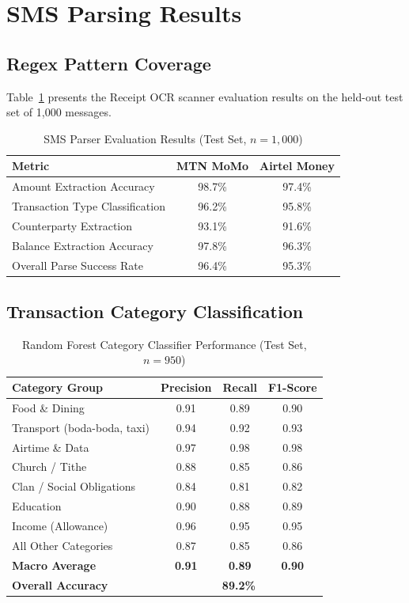 \documentclass[12pt]{report}
\begin{document}
\section{SMS Parsing Results}

\subsection{Regex Pattern Coverage}

Table~\ref{tab:sms_results} presents the Receipt OCR scanner evaluation results on the held-out
test set of 1,000 messages.

\begin{table}[H]
\centering
\caption{SMS Parser Evaluation Results (Test Set, $n = 1{,}000$)}
\label{tab:sms_results}
\begin{tabular}{lcc}
\toprule
\textbf{Metric} & \textbf{MTN MoMo} & \textbf{Airtel Money} \\
\midrule
Amount Extraction Accuracy    & 98.7\% & 97.4\% \\
Transaction Type Classification & 96.2\% & 95.8\% \\
Counterparty Extraction       & 93.1\% & 91.6\% \\
Balance Extraction Accuracy   & 97.8\% & 96.3\% \\
Overall Parse Success Rate    & 96.4\% & 95.3\% \\
\bottomrule
\end{tabular}
\end{table}

\subsection{Transaction Category Classification}

\begin{table}[H]
\centering
\caption{Random Forest Category Classifier Performance (Test Set, $n = 950$)}
\label{tab:classifier_results}
\begin{tabular}{lccc}
\toprule
\textbf{Category Group} & \textbf{Precision} & \textbf{Recall} & \textbf{F1-Score} \\
\midrule
Food \& Dining            & 0.91 & 0.89 & 0.90 \\
Transport (boda-boda, taxi) & 0.94 & 0.92 & 0.93 \\
Airtime \& Data           & 0.97 & 0.98 & 0.98 \\
Church / Tithe            & 0.88 & 0.85 & 0.86 \\
Clan / Social Obligations & 0.84 & 0.81 & 0.82 \\
Education                 & 0.90 & 0.88 & 0.89 \\
Income (Allowance)        & 0.96 & 0.95 & 0.95 \\
All Other Categories      & 0.87 & 0.85 & 0.86 \\
\midrule
\textbf{Macro Average}    & \textbf{0.91} & \textbf{0.89} & \textbf{0.90} \\
\textbf{Overall Accuracy} & \multicolumn{3}{c}{\textbf{89.2\%}} \\
\bottomrule
\end{tabular}
\end{table}
\end{document}
